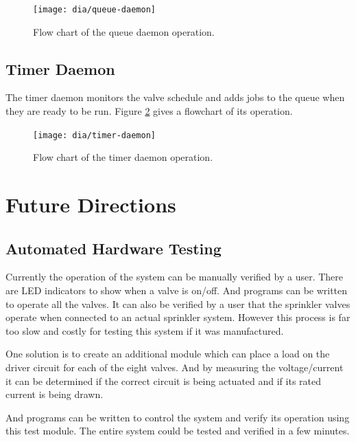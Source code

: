 \documentclass{article}
\begin{document}
\begin{figure}[htbp!]
\begin{center}
\texttt{[image: dia/queue-daemon]}
\end{center}
\caption{Flow chart of the queue daemon operation.}
\label{fig:queue-daemon}
\end{figure}


\clearpage
\FloatBarrier
\subsection{Timer Daemon}

The timer daemon monitors the valve schedule and adds jobs
to the queue when they are ready to be run.
Figure \ref{fig:timer-daemon} gives a flowchart of its operation.

\begin{figure}[htbp!]
\begin{center}
\texttt{[image: dia/timer-daemon]}
\end{center}
\caption{Flow chart of the timer daemon operation.}
\label{fig:timer-daemon}
\end{figure}


\section{Future Directions}

\subsection{Automated Hardware Testing}

Currently the operation of the system can be manually
verified by a user.  There are LED indicators to show
when a valve is on/off.  And programs can be written
to operate all the valves.
It can also be verified by a user that the sprinkler
valves operate when connected to an actual sprinkler
system.
However this process is far too slow and costly for
testing this system if it was manufactured.

One solution is to create an additional module which
can place a load on the driver circuit for each of
the eight valves.
And by measuring the voltage/current it can be determined
if the correct circuit is being actuated and if
its rated current is being drawn.

And programs can be written to control the system and
verify its operation using this test module.
The entire system could be tested and verified in a
few minutes.
\end{document}
